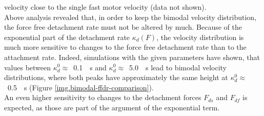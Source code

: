 velocity close to the single fast motor velocity (data not shown). \\
Above analysis revealed that, in order to keep the bimodal velocity distribution, the force free detachment rate must not be altered by much. Because of the exponential part of the detachment rate
$\kappa_d\left(F\right)$, the velocity distribution is much more sensitive to changes to the force free detachment rate than to the attachment rate. Indeed, simulations with the given parameters have
shown, that values between \mbox{$\kappa_d^0 \approx $ \SI{0.1}{\per\second}} and \mbox{$\kappa_d^0 \approx $ \SI{5.0}{\per\second}} lead to bimodal velocity distributions, where both peaks have
approximately the same height at \mbox{$\kappa_d^0 \approx $ \SI{0.5}{\per\second}} (Figure \ref{img.bimodal-ffdr-comparison}). \\
An even higher sensitivity to changes to the detachment forces $F_{ds}$ and $F_{df}$ is expected, as those are part of the argument of the exponential term.


